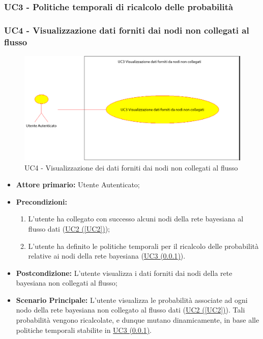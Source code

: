 \pagebreak

\subsubsection{UC3 - Politiche temporali di ricalcolo delle probabilità}\label{UC3}

\pagebreak

\subsubsection{UC4 - Visualizzazione dati forniti dai nodi non collegati al flusso}\label{UC4}

\begin{figure}[H]
\centering
\includegraphics[scale=0.4]{./images/UC4.png}
\caption{UC4 - Visualizzazione dei dati forniti dai nodi non collegati al flusso}
\end{figure}

\begin{itemize}
\item \textbf{Attore primario:} Utente Autenticato;
\item \textbf{Precondizioni:}
	\begin{enumerate}
	\item L'utente ha collegato con successo alcuni nodi della rete bayesiana al flusso dati (\hyperref[UC2]{UC2 (\ref*{UC2})});
	\item L'utente ha definito le politiche temporali per il ricalcolo delle probabilità relative ai nodi della rete bayesiana (\hyperref[UC3]{UC3 (\ref*{UC3})}).
	\end{enumerate}
\item \textbf{Postcondizione:} L'utente visualizza i dati forniti dai nodi della rete bayesiana non collegati al flusso;
\item \textbf{Scenario Principale:} L'utente visualizza le probabilità associate ad ogni nodo della rete bayesiana non collegato al flusso dati (\hyperref[UC2]{UC2 (\ref*{UC2})}). Tali probabilità vengono ricalcolate, e dunque mutano dinamicamente, in base alle politiche temporali stabilite in \hyperref[UC3]{UC3 (\ref*{UC3})}.
\end{itemize}

